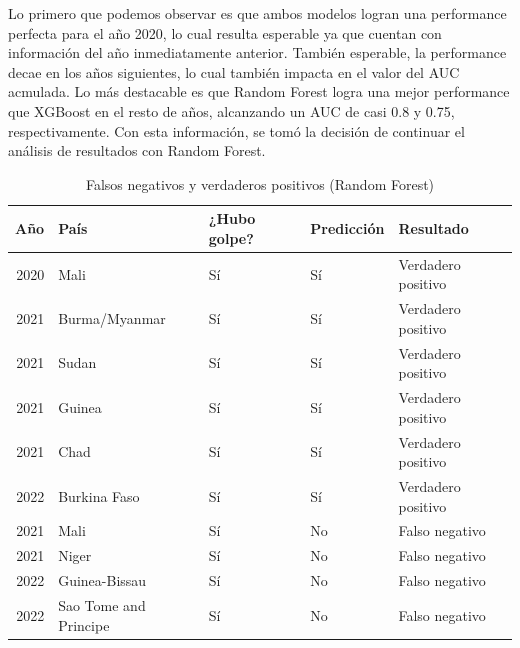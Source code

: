 \documentclass{article}
\begin{document}
Lo primero que podemos observar es que ambos modelos logran una performance perfecta 
para el año 2020, lo cual resulta esperable ya que cuentan con información del año 
inmediatamente anterior. También esperable, la performance decae en los años siguientes, 
lo cual también impacta en el valor del AUC acmulada. Lo más destacable es que Random 
Forest logra una mejor performance que XGBoost en el resto de años, alcanzando un AUC de 
casi 0.8 y 0.75, respectivamente. Con esta información, se tomó la decisión de continuar 
el análisis de resultados con Random Forest.


\begin{table}[H]
  \centering
    \begin{tabular}{rllll}
      \toprule
      Año & País & ¿Hubo golpe? & Predicción & Resultado \\
      \midrule
      2020 & Mali                  & Sí & Sí & Verdadero positivo \\
      2021 & Burma/Myanmar         & Sí & Sí & Verdadero positivo \\
      2021 & Sudan                 & Sí & Sí & Verdadero positivo \\
      2021 & Guinea                & Sí & Sí & Verdadero positivo \\
      2021 & Chad                  & Sí & Sí & Verdadero positivo \\
      2022 & Burkina Faso          & Sí & Sí & Verdadero positivo \\
      2021 & Mali                  & Sí & No & Falso negativo \\
      2021 & Niger                 & Sí & No & Falso negativo \\
      2022 & Guinea-Bissau         & Sí & No & Falso negativo \\
      2022 & Sao Tome and Principe & Sí & No & Falso negativo \\
      \bottomrule
    \end{tabular}
  \caption{Falsos negativos y verdaderos positivos (Random Forest) \label{tab:resultados}}
\end{table}
\end{document}
